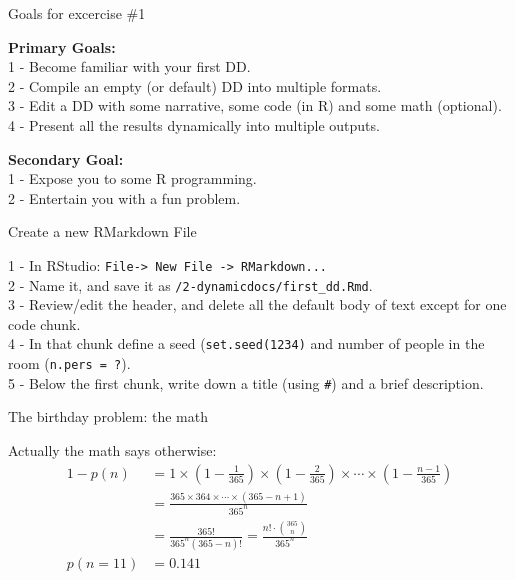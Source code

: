 \documentclass[ignorenonframetext,]{beamer}
\begin{document}
\begin{frame}{Goals for excercise \#1}
\protect\hypertarget{goals-for-excercise-1}{}

\textbf{Primary Goals:}\\
1 - Become familiar with your first DD.\\
2 - Compile an empty (or default) DD into multiple formats.\\
3 - Edit a DD with some narrative, some code (in R) and some math
(optional).\\
4 - Present all the results dynamically into multiple outputs.

\pause

\textbf{Secondary Goal:}\\
1 - Expose you to some R programming.\\
2 - Entertain you with a fun problem.

\end{frame}

\begin{frame}[fragile]{Create a new RMarkdown File}
\protect\hypertarget{create-a-new-rmarkdown-file}{}

1 - In RStudio:
\texttt{File-\textgreater{}\ New\ File\ -\textgreater{}\ RMarkdown...}\\
2 - Name it, and save it as \texttt{/2-dynamicdocs/first\_dd.Rmd}.\\
3 - Review/edit the header, and delete all the default body of text
except for one code chunk.\\
4 - In that chunk define a seed (\texttt{set.seed(1234)} and number of
people in the room (\texttt{n.pers\ =\ ?}).\\
5 - Below the first chunk, write down a title (using \texttt{\#}) and a
brief description.

\end{frame}

\begin{frame}{The birthday problem: the math}
\protect\hypertarget{the-birthday-problem-the-math}{}

Actually the math says otherwise: \begin{align} 
 1 -  p(n) &= 1 \times \left(1-\frac{1}{365}\right) \times \left(1-\frac{2}{365}\right) \times \cdots \times \left(1-\frac{n-1}{365}\right) \nonumber  \\  &= \frac{ 365 \times 364 \times \cdots \times (365-n+1) }{ 365^n } \nonumber \\ &= \frac{ 365! }{ 365^n (365-n)!} = \frac{n!\cdot\binom{365}{n}}{365^n}\\
p(n= 11) &= 0.141  \nonumber
\end{align}

\end{frame}
\end{document}
